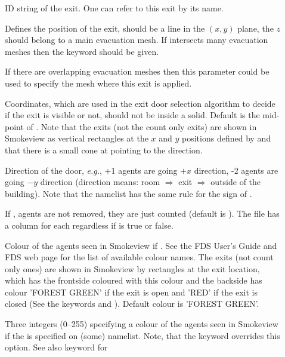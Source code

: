 \documentclass[12pt,a4paper,final,twoside]{stylevk}
\begin{document}
\begin{description}
%
\item[] ID string of the exit.  One can refer to this exit by
  its name.
%
\item[] Defines the position of the exit, should be a line
  in the $(x,y)$ plane, the $z$ should belong to a main evacuation
  mesh.  If  intersects many evacuation meshes then the
  keyword  should be given.
%
\item[] If there are overlapping evacuation meshes
  then this parameter could be used to specify the mesh where this
  exit is applied.
%
\item[] Coordinates, which are used in the exit door
  selection algorithm to decide if the exit is visible or not, should
  not be inside a solid.  Default is the mid-point of .
  Note that the exits (not the count only exits) are shown in
  Smokeview as vertical rectangles at the $x$ and $y$ positions
  defined by  and that there is a small cone at 
  pointing to the  direction.
%
\item[] Direction of the door, \emph{e.g.}, +1 agents are
  going $+x$ direction, -2 agents are going $-y$ direction (direction
  means: room $\Rightarrow$ exit $\Rightarrow$ outside of the
  building).  Note that the namelist  has the same rule
  for the sign of . 
%
\item[] If , agents are not removed,
  they are just counted (default is ).  The
   file has a column for each 
  regardless if  is true or false.
%
\item[] Colour of the agents seen in Smokeview if
  .  See the FDS User's Guide and FDS web page
  for the list of available colour names.  The exits (not count only
  ones) are shown in Smokeview by rectangles at the exit location,
  which has the frontside coloured with this colour and the backside
  has colour 'FOREST GREEN' if the exit is open and 'RED' if the exit
  is closed (See the keywords  and
  ).  Default colour is 'FOREST GREEN'.
%
\item[] Three integers (0--255) specifying a colour of the
  agents seen in Smokeview if the  is specified
  on (some)  namelist.  Note, that the 
  keyword overrides this option.  See also  keyword for

\end{description}
\end{document}
